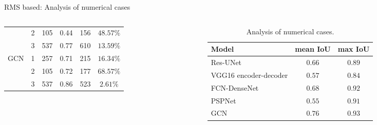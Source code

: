 \documentclass[10pt,aspectratio=169,dvipsnames]{beamer} %
\begin{document}
\begin{frame}{RMS based: Analysis of numerical cases}
\begin{columns}[T]
\begin{column}[c]{0.48\textwidth}
\begin{table}[ht!]
\begin{tabular}{cccccc}
										& 2 & 105 & \multicolumn{1}{c}{0.44} & \multicolumn{1}{c}{156} & \(48.57\%\) \\ 
										& 3 & 537 & \multicolumn{1}{c}{0.77} & \multicolumn{1}{c}{610} & \(13.59\%\) \\ 
										\midrule
										\multirow{3}{*}{GCN} 
										& 1 & 257 & \multicolumn{1}{c}{0.71} & \multicolumn{1}{c}{215} & \(16.34\%\) \\ 
										& 2 & 105 & \multicolumn{1}{c}{0.72} & \multicolumn{1}{c}{177} & \(68.57\%\) \\ 
										& 3 & 537 & \multicolumn{1}{c}{0.86} & \multicolumn{1}{c}{523} & \(2.61\%\) \\ 
										\bottomrule[1.5pt]
									\end{tabular}	
								\end{table}
							\end{column}
						\hfill
			\begin{column}[c]{0.9\textwidth}
				\begin{table}[ht!]
					\centering
					\caption{Analysis of numerical cases.}
					\label{tab:table_all_numerical_cases}	
					\begin{tabular}{lcc}
						\toprule[1.5pt]
						Model & mean IoU & max IoU \\ 
						\midrule 
						Res-UNet & \(0.66\) & \(0.89\) \\ 
						VGG16 encoder-decoder & \(0.57\) & \(0.84\) \\ 
						FCN-DenseNet & \(0.68\) & \(0.92\) \\ 
						PSPNet & \(0.55\) & \(0.91\) \\ 
						GCN & \(0.76\) & \(0.93\) \\ 
						\bottomrule[1.5pt]
					\end{tabular}
				\end{table}
			\end{column}
		\end{columns}
	\end{frame}
\end{document}
